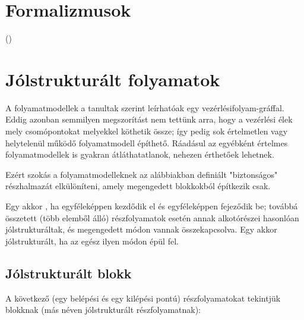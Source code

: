 \section{Formalizmusok}

  ()






\section{Jólstrukturált folyamatok}\label{sec:jolstrukturalt-folyamatok}

A folyamatmodellek a tanultak szerint leírhatóak egy vezérlésifolyam-gráffal. Eddig azonban semmilyen megszorítást nem tettünk arra, hogy a vezérlési élek mely csomópontokat melyekkel köthetik össze; így pedig sok értelmetlen vagy helytelenül működő folyamatmodell építhető. Ráadásul az egyébként értelmes folyamatmodellek is gyakran átláthatatlanok, nehezen érthetőek lehetnek. 

Ezért szokás a folyamatmodelleknek az alábbiakban definiált "biztonságos" részhalmazát elkülöníteni, amely megengedett blokkokból építkezik csak. 

\begin{definicio}
	Egy  akkor , ha egyféleképpen kezdődik el és egyféleképpen fejeződik be; továbbá összetett (több elemből álló) részfolyamatok esetén annak alkotórészei hasonlóan jólstrukturáltak, és megengedett módon vannak összekapcsolva. Egy  akkor jólstrukturált, ha az egész ilyen módon épül fel.
\end{definicio}

\subsection{Jólstrukturált blokk}

A következő (egy belépési és egy kilépési pontú) részfolyamatokat tekintjük  blokknak (más néven jólstrukturált részfolyamatnak):

